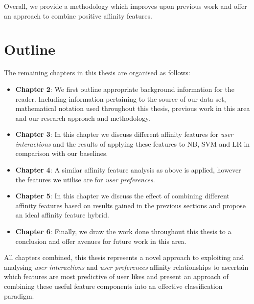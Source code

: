 Overall, we provide a methodology which improves upon previous work and offer an approach to combine positive affinity features.

\section{Outline}
\label{sec:outline}

The remaining chapters in this thesis are organised as follows:
\begin{itemize}
\item \textbf{Chapter 2}: We first outline appropriate background information for the reader. Including information pertaining to the source of 
our data set, mathematical notation used throughout this thesis, previous work in this area and our research approach and methodology.
\item \textbf{Chapter 3}: In this chapter we discuss different affinity features for \emph{user interactions} and the results of applying these features to NB, SVM and LR 
in comparison with our baselines.
\item \textbf{Chapter 4}: A similar affinity feature analysis as above is applied, however the features we utilise are for \emph{user preferences}.
\item \textbf{Chapter 5}: In this chapter we discuss the effect of combining different affinity features based on results gained in the previous sections
and propose an ideal affinity feature hybrid.
\item \textbf{Chapter 6}: Finally, we draw the work done throughout this thesis to a conclusion and offer avenues for future work in this area.
\end{itemize}

All chapters combined, this thesis represents a novel approach to exploiting and analysing \emph{user interactions} and \emph{user preferences} affinity relationships
to ascertain which features are most predictive of user likes and present an approach of combining these useful feature components into an effective 
classification paradigm.

